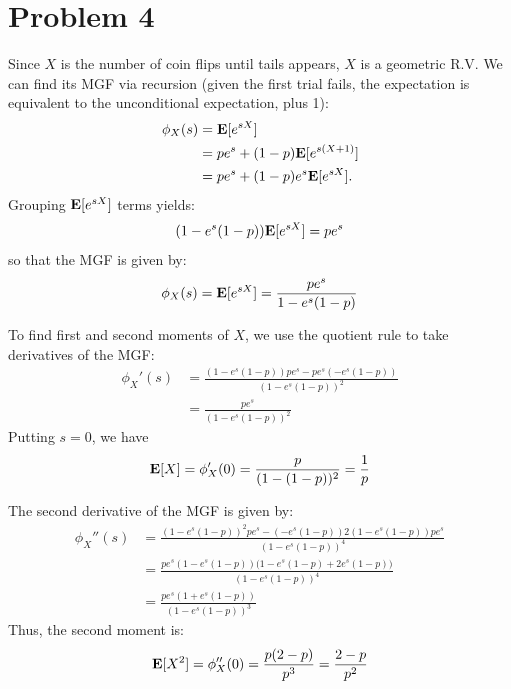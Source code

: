 \documentclass{homework}
\begin{document}
\section{Problem 4}
\begin{letterenum}
\item Since $X$ is the number of coin flips until tails appears, $X$ is a geometric
R.V. We can find its MGF via recursion (given the first trial fails, the expectation is 
equivalent to the unconditional expectation, plus 1):
\begin{align*}
    \phi_X(s) &= {\bf E}[e^{sX}] \\
        &= pe^s + (1 - p) {\bf E}[e^{s(X+1)}] \\
        &= pe^s + (1 - p)e^s {\bf E}[e^{sX}].
\end{align*}
Grouping ${\bf E}[e^{sX}]$ terms yields:
\begin{equation*}
    (1 - e^s(1 - p)) {\bf E}[e^{sX}] = pe^s
\end{equation*}
so that the MGF is given by:
\begin{equation*}
    \phi_X(s) = {\bf E}[e^{sX}] = \frac{pe^s}{1 - e^s(1 - p)}
\end{equation*}

\item To find first and second moments of $X$, we use the quotient rule to take
derivatives of the MGF:
\begin{align*}
    \phi_X'(s) &= \frac{(1 - e^s(1-p))pe^s - pe^s (-e^s(1-p))}{(1 - e^s(1-p))^2} \\
        &= \frac{pe^s}{(1 - e^s(1-p))^2}
\end{align*}
Putting $s=0$, we have
\begin{equation*}
    {\bf E}[X] = \phi_X'(0) = \frac{p}{(1 - (1-p))^2} = \frac{1}{p}
\end{equation*}

The second derivative of the MGF is given by:
\begin{align*}
    \phi_X''(s) &= \frac{(1 - e^s(1-p))^2pe^s - (-e^s(1-p))2(1-e^s(1-p))pe^s}{(1-e^s(1-p))^4} \\
        &= \frac{pe^s(1 - e^s(1-p))\biggl(1 - e^s(1-p) + 2e^s(1-p)\biggr)}{(1 - e^s(1-p))^4} \\
        &= \frac{pe^s(1 + e^s(1-p))}{(1 - e^s(1-p))^3}
\end{align*}
Thus, the second moment is:
\begin{equation*}
    {\bf E}[X^2] = \phi_X''(0) = \frac{p(2-p)}{p^3} = \frac{2-p}{p^2}
\end{equation*}
\end{letterenum}
\end{document}
